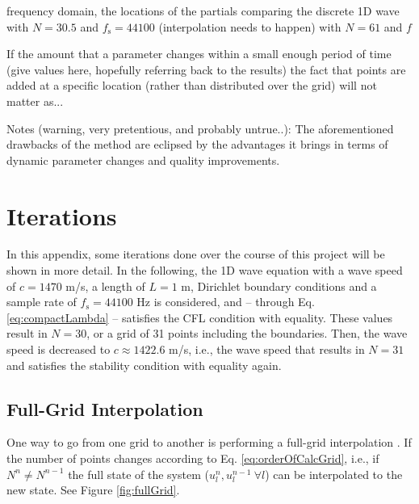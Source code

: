 \documentclass[dvipsnames, reprint]{JASA}
\def\SWcomment[#1]{\textcolor{Bittersweet}{#1}}
\begin{document}
frequency domain, the locations of the partials comparing the discrete 1D wave with $N = 30.5$ and $f_\text{s} = 44100$ (interpolation needs to happen) with $N = 61$ and $f$ 

If the amount that a parameter changes within a small enough period of time (give values here, hopefully referring back to the results) the fact that points are added at a specific location (rather than distributed over the grid) will not matter as... 



\SWcomment[Notes (warning, very pretentious, and probably untrue..):] The aforementioned drawbacks of the method are eclipsed by the advantages it brings in terms of dynamic parameter changes and quality improvements. 

\appendix
\section{Iterations}\label{app:A}
In this appendix, some iterations done over the course of this project will be shown in more detail. In the following, the 1D wave equation with a wave speed of $c = 1470$ m/s, a length of $L = 1$ m, Dirichlet boundary conditions and a sample rate of $f_\text{s} = 44100$ Hz is considered, and -- through Eq. \eqref{eq:compactLambda} -- satisfies the CFL condition with equality. These values result in $N = 30$, or a grid of 31 points including the boundaries. Then, the wave speed is decreased to $c \approx 1422.6$ m/s, i.e., the wave speed that results in $N=31$ and satisfies the stability condition with equality again. 

\subsection{Full-Grid Interpolation}
One way to go from one grid to another is performing a full-grid interpolation \cite[Chap. 5]{bilbao2009}. If the number of points changes according to Eq. \eqref{eq:orderOfCalcGrid}, i.e., if $N^n \neq N^{n-1}$ the full state of the system ($u_l^n, u_l^{n-1}\ \forall l$)  can be interpolated to the new state. See Figure \ref{fig:fullGrid}. 
\end{document}
